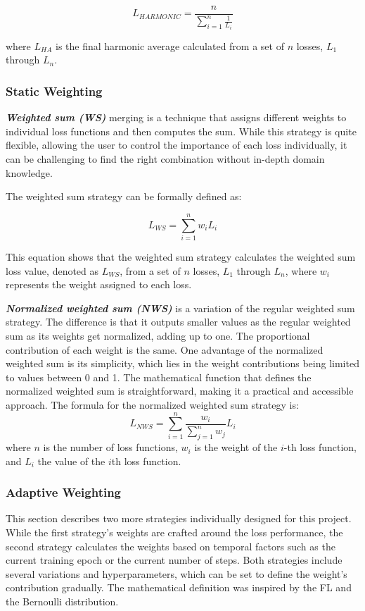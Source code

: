 \begin{equation}
  L_{HARMONIC} = \frac{n}{\sum_{i=1}^{n} \frac{1}{L_i}}
\end{equation}

where $L_{HA}$ is the final harmonic average calculated from a set of $n$ losses, $L_1$ through $L_n$.
\subsubsection*{Static Weighting}
\textbf{\emph{Weighted sum (WS)}}  merging is a technique that assigns different weights to individual loss functions and then computes the sum. While this strategy is quite flexible, allowing the user to control the importance of each loss individually, it can be challenging to find the right combination without in-depth domain knowledge.

The weighted sum strategy can be formally defined as:

\begin{equation}
  L_{WS} = \sum_{i=1}^{n} w_i L_i
\end{equation}

This equation shows that the weighted sum strategy calculates the weighted sum loss value, denoted as $L_{WS}$, from a set of $n$ losses, $L_1$ through $L_n$, where $w_i$ represents the weight assigned to each loss.

\textbf{\emph{Normalized weighted sum (NWS)}} is a variation of the regular weighted sum strategy. The difference is that it outputs smaller values as the regular weighted sum as its weights get normalized, adding up to one. The proportional contribution of each weight is the same. One advantage of the normalized weighted sum is its simplicity, which lies in the weight contributions being limited to values between 0 and 1. The mathematical function that defines the normalized weighted sum is straightforward, making it a practical and accessible approach. The formula for the normalized weighted sum strategy is:
\begin{equation}
  L_{NWS} = \sum_{i=1}^{n} \frac{w_i}{\sum_{j=1}^{n} w_j} L_i
\end{equation}
where $n$ is the number of loss functions, $w_i$ is the weight of the $i$-th loss function, and $L_i$ the value of the $i$th loss function.
\subsubsection*{Adaptive Weighting}
This section describes two more strategies individually designed for this project. While the first strategy's weights are crafted around the loss performance, the second strategy calculates the weights based on temporal factors such as the current training epoch or the current number of steps. Both strategies include several variations and hyperparameters, which can be set to define the weight's contribution gradually. The mathematical definition was inspired by the \acf{FL} and the Bernoulli distribution.

